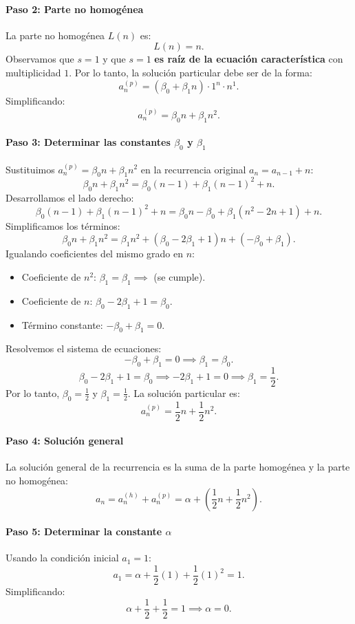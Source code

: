 \documentclass{article}
\begin{document}
\paragraph{Paso 2: Parte no homogénea}
La parte no homogénea $L(n)$ es:
\[
L(n) = n.
\]
Observamos que $s = 1$ y que $s = 1$ \textbf{es raíz de la ecuación característica} con multiplicidad $1$. Por lo tanto, la solución particular debe ser de la forma:
\[
a_n^{(p)} = (\beta_0 + \beta_1n) \cdot 1^n \cdot n^1.
\]
Simplificando:
\[
a_n^{(p)} = \beta_0 n + \beta_1 n^2.
\]

\paragraph{Paso 3: Determinar las constantes $\beta_0$ y $\beta_1$}
Sustituimos $a_n^{(p)} = \beta_0 n + \beta_1 n^2$ en la recurrencia original $a_n = a_{n-1} + n$:
\[
\beta_0 n + \beta_1 n^2 = \beta_0 (n-1) + \beta_1 (n-1)^2 + n.
\]
Desarrollamos el lado derecho:
\[
\beta_0 (n-1) + \beta_1 (n-1)^2 + n = \beta_0 n - \beta_0 + \beta_1 (n^2 - 2n + 1) + n.
\]
Simplificamos los términos:
\[
\beta_0 n + \beta_1 n^2 = \beta_1 n^2 + (\beta_0 - 2\beta_1 + 1)n + (-\beta_0 + \beta_1).
\]
Igualando coeficientes del mismo grado en $n$:
\begin{itemize}
    \item Coeficiente de $n^2$: $\beta_1 = \beta_1 \implies$ (se cumple).
    \item Coeficiente de $n$: $\beta_0 - 2\beta_1 + 1 = \beta_0$.
    \item Término constante: $-\beta_0 + \beta_1 = 0$.
\end{itemize}

Resolvemos el sistema de ecuaciones:
\[
-\beta_0 + \beta_1 = 0 \implies \beta_1 = \beta_0.
\]
\[
\beta_0 - 2\beta_1 + 1 = \beta_0 \implies -2\beta_1 + 1 = 0 \implies \beta_1 = \frac{1}{2}.
\]
Por lo tanto, $\beta_0 = \frac{1}{2}$ y $\beta_1 = \frac{1}{2}$. La solución particular es:
\[
a_n^{(p)} = \frac{1}{2}n + \frac{1}{2}n^2.
\]

\paragraph{Paso 4: Solución general}
La solución general de la recurrencia es la suma de la parte homogénea y la parte no homogénea:
\[
a_n = a_n^{(h)} + a_n^{(p)} = \alpha + \left( \frac{1}{2}n + \frac{1}{2}n^2 \right).
\]

\paragraph{Paso 5: Determinar la constante $\alpha$}
Usando la condición inicial $a_1 = 1$:
\[
a_1 = \alpha + \frac{1}{2}(1) + \frac{1}{2}(1)^2 = 1.
\]
Simplificando:
\[
\alpha + \frac{1}{2} + \frac{1}{2} = 1 \implies \alpha = 0.
\]
\end{document}
